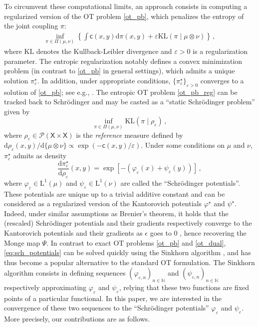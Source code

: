 \documentclass[final,12pt]{colt2023} %
\def\msx{\mathsf{X}}
\def\cost{\mathsf{c}}
\def\psiMonge{\Psi}
\newcommand{\cP}{\mathcal{P}}
\newcommand{\De}{\mathrm{d}}
\newcommand{\defEns}[1]{\left\lbrace #1 \right\rbrace }
\def\nset{\mathbb{N}}
\def\varphistar{\varphi^\star}
\def\psistar{\psi^{\star}}
\begin{document}
To circumvent these computational limits, an approach consists in computing a regularized version of the OT problem \eqref{ot_pb}, which penalizes the entropy of the joint coupling $\pi$:
\begin{align}\label{ot_pb_reg}
    \inf_{\pi \in \Pi(\mu, \nu)}\defEns{\int \cost(x,y)\De \pi(x,y) + \varepsilon \mathrm{KL}(\pi \mid \mu \otimes \nu) } \, ,
\end{align}
where $\mathrm{KL}$ denotes the Kullback-Leibler divergence and $\varepsilon>0$ is a regularization parameter. The entropic regularization notably defines a  convex minimization problem (in contrast to \eqref{ot_pb} in general settings), which admits a unique solution $\pi_\varepsilon^\star$. In addition, under appropriate conditions, $\{\pi_\varepsilon^\star\}_{\varepsilon >0}$ converges to a solution of \eqref{ot_pb}; see e.g., \cite{leonard2012schrodinger}.  The entropic OT problem \eqref{ot_pb_reg} can be tracked back to Schr\"odinger \citep{Schr} and may be casted as a ``static Schr\"odinger problem'' \citep{LeoSch, conforti2019second, carlier2017convergence} given by
\begin{equation}
  \label{ot_pb_reg_1}
    \inf_{\pi \in \Pi(\mu, \nu)}\mathrm{KL}(\pi \mid \rho_{\varepsilon}) \, ,
\end{equation}
where $\rho_{\varepsilon} \in \cP(\msx \times \msx)$ is the \textit{reference} measure defined by $\De \rho_{\varepsilon} (x,y)/\De\{\mu \otimes \nu\}\propto\exp(-\cost(x,y)/\varepsilon)$.
Under some conditions on $\mu$ and $\nu$,  $\pi_\varepsilon^\star$ admits as  density 
\begin{equation}\label{eq:sch_potentials}
\frac{\De \pi_\varepsilon^\star}{\De \rho_{\varepsilon} }(x,y)=\exp[-(\varphi_\varepsilon(x)+\psi_\varepsilon(y))]\, ,
\end{equation}
where $\varphi_\varepsilon \in \mathrm{L}^1(\mu)$ and $\psi_\varepsilon \in \mathrm{L}^1(\nu)$ are called the ``Schr\"odinger potentials''. These potentials are unique up to a trivial additive constant and can be considered as a regularized version of the Kantorovich potentials $\varphistar$ and $\psistar$. Indeed, under similar assumptions as Brenier's theorem, it holds that the (rescaled) Schr\"odinger potentials and their gradients respectively converge to the Kantorovich potentials and their gradients as $\epsilon$ goes to 0 \citep{lagg2022gradient}, hence recovering the Monge map $\psiMonge$.  In contrast to exact OT problems \eqref{ot_pb} and \eqref{ot_dual}, \eqref{eq:sch_potentials} can be solved quickly using the Sinkhorn algorithm \citep{Sinkhorn64, cuturi2013sinkhorn}, and has thus become a popular alternative to the standard OT formulation.
The Sinkhorn algorithm consists in defining sequences $(\varphi_{\varepsilon,n})_{n \in\nset}$ and $(\psi_{\varepsilon,n})_{n \in\nset}$ respectively approximating $\varphi_{\varepsilon}$ and $\psi_{\varepsilon}$, relying that these two functions are fixed points of a particular functional. In this paper, we are interested in the convergence of these two sequences to the ``Schr\"odinger potentials'' $\varphi_{\varepsilon}$ and $\psi_{\varepsilon}$. More precisely, our contributions are as follows.
\end{document}
